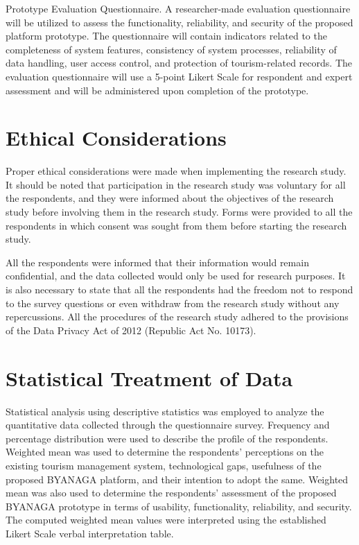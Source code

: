 \documentclass{research}
\begin{document}
Prototype Evaluation Questionnaire. A researcher-made evaluation 
questionnaire will be utilized to assess the functionality, reliability, and 
security of the proposed platform prototype. The questionnaire will contain 
indicators related to the completeness of system features, consistency of 
system processes, reliability of data handling, user access control, and 
protection of tourism-related records. The evaluation questionnaire will use 
a 5-point Likert Scale for respondent and expert assessment and will be 
administered upon completion of the prototype.

\section{Ethical Considerations}

Proper ethical considerations were made when implementing the research study. It should be noted that participation in the research study was voluntary for all the respondents, and they were informed about the objectives of the research study before involving them in the research study. Forms were provided to all the respondents in which consent was sought from them before starting the research study.

All the respondents were informed that their information would remain confidential, and the data collected would only be used for research purposes. It is also necessary to state that all the respondents had the freedom not to respond to the survey questions or even withdraw from the research study without any repercussions. All the procedures of the research study adhered to the provisions of the Data Privacy Act of 2012 (Republic Act No. 10173).

\section{Statistical Treatment of Data}

Statistical analysis using descriptive statistics was employed to analyze the quantitative data collected through the questionnaire survey. 
Frequency and percentage distribution were used to describe the profile of the respondents. 
Weighted mean was used to determine the respondents' perceptions on the existing tourism management system, technological gaps, usefulness of the proposed BYANAGA platform, and their intention to adopt the same.
Weighted mean was also used to determine the respondents’ assessment of the proposed BYANAGA prototype in terms of usability, functionality, reliability, and security. The computed weighted mean values were interpreted using the established Likert Scale verbal interpretation table.
\end{document}
